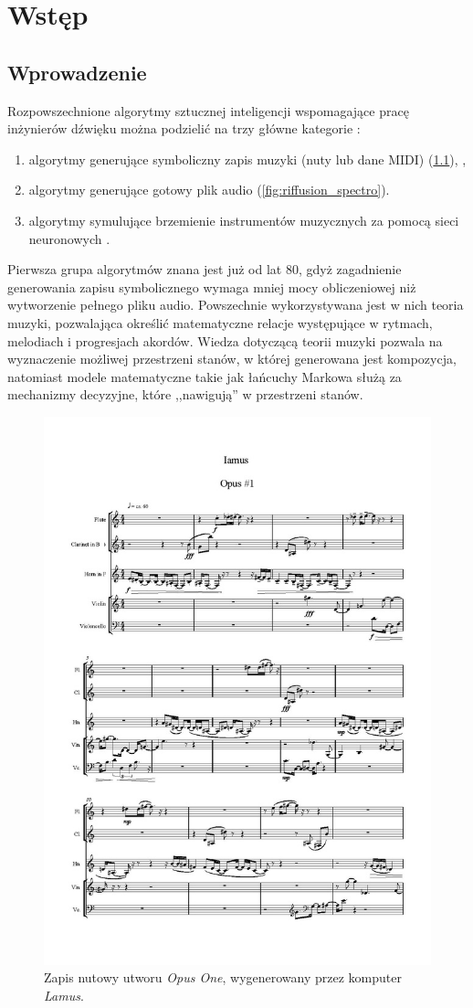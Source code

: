 \chapter{Wstęp}
\section{Wprowadzenie}


Rozpowszechnione algorytmy sztucznej inteligencji wspomagające pracę inżynierów dźwięku można podzielić na trzy główne kategorie \cite{analysis_generative} \label{traditional_algos}:

\begin{enumerate}
    \item algorytmy generujące symboliczny zapis muzyki (nuty lub dane MIDI) (\ref{fig:lamus_notes}), \cite{zhang2023language},
    \item algorytmy generujące gotowy plik audio (\ref{fig:riffusion_spectro}).
    \item algorytmy symulujące brzemienie instrumentów muzycznych za pomocą sieci neuronowych \cite{engel2017neural}.
\end{enumerate}

Pierwsza grupa algorytmów znana jest już od lat 80, gdyż zagadnienie generowania zapisu symbolicznego wymaga mniej mocy obliczeniowej niż wytworzenie pełnego pliku audio.
Powszechnie wykorzystywana jest w nich teoria muzyki, pozwalająca określić matematyczne relacje występujące w rytmach, melodiach i progresjach akordów.
Wiedza dotyczącą teorii muzyki pozwala na wyznaczenie możliwej przestrzeni stanów, w której generowana jest kompozycja,
natomiast modele matematyczne takie jak łańcuchy Markowa służą za mechanizmy decyzyjne, które ,,nawigują'' w przestrzeni stanów.

\begin{figure}[H]
    \centering
    \includegraphics[width=0.4\linewidth]{rys01/lamus_notes.jpg}
    \caption{Zapis nutowy utworu \textit{Opus One}, wygenerowany przez komputer \textit{Lamus}.}
    \label{fig:lamus_notes}
\end{figure}

